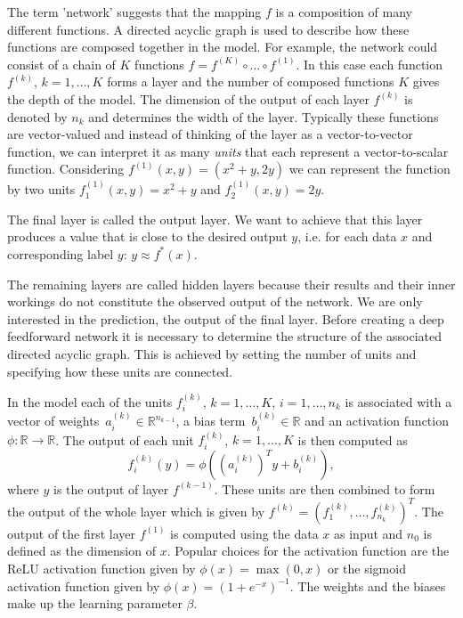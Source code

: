 \documentclass[12pt, a4paper]{scrartcl}
\theoremstyle{definition}
\theoremstyle{plain}
\numberwithin{equation}{section}
\numberwithin{figure}{section}
\numberwithin{table}{section}
\begin{document}
	The term 'network' suggests that the mapping $f$ is a composition of many different functions.
	A directed acyclic graph is used to describe how these functions are composed together in the model.
	For example, the network could consist of a chain of $K$ functions $ f = f^{(K)}\circ \dots \circ f^{(1)}$.
	In this case each function~$f^{(k)}$, $k=1,\dots,K$ forms a layer and the number of composed functions $K$ gives the depth of the model.
	The dimension of the output of each layer $f^{(k)}$ is denoted by $n_k$ and determines the width of the layer.
	Typically these functions are vector-valued and instead of thinking of the layer as a vector-to-vector function, we can interpret it as many \emph{units} that each represent a vector-to-scalar function.
	Considering $f^{(1)}(x,y)= (x^2+y,2y)$ we can represent the function by two units $f^{(1)}_1 (x,y) = x^2+y$ and $f^{(1)}_2(x,y) = 2y$.
	
	The final layer is called the output layer.
	We want to achieve that this layer produces a value that is close to the desired output $y$, i.e. for each data $x$ and corresponding label $y$: $y \approx f^*(x)$.
	
	The remaining layers are called hidden layers because their results and their inner workings do not constitute the observed output of the network.
	We are only interested in the prediction, the output of the final layer.
	Before creating a deep feedforward network it is necessary to determine the structure of the associated directed acyclic graph.
	This is achieved by setting the number of units and specifying how these units are connected.
	
	In the model each of the units $f^{(k)}_i$, $k=1,\dots,K$, $i = 1,\dots,n_{k}$ is associated with a vector of weights~$a^{(k)}_i \in \mathbb{R}^{n_{k-1}}$, a bias term~$b^{(k)}_i\in \mathbb{R}$ and an activation function~$\phi: \mathbb{R} \to \mathbb{R}$.
	The output of each unit $f^{(k)}_i$, $k=1,\dots,K$ is then computed as
	\begin{equation*}
	f_i^{(k)}(y) = \phi \left(\left(a^{(k)}_i\right)^Ty + b^{(k)}_i\right),
	\end{equation*}
	where $y$ is the output of layer $f^{(k-1)}$.
	These units are then combined to form the output of the whole layer which is given by $f^{(k)} = \left(f^{(k)}_1,\dots, f^{(k)}_{n_k}\right)^T$.
	The output of the first layer $f^{(1)}$ is computed using the data $x$ as input and $n_0$ is defined as the dimension of $x$.
	Popular choices for the activation function are the ReLU activation function given by $\phi(x) = \max(0,x)$ or the sigmoid activation function given by $\phi(x) = (1+e^{-x})^{-1}$.
	The weights and the biases make up the learning parameter $\beta$.
	
\end{document}
